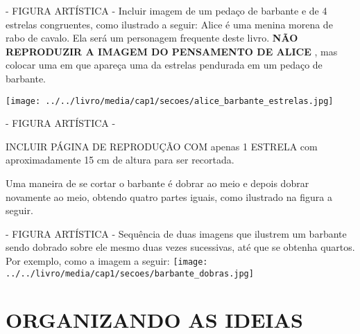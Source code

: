 \documentclass[a4paper,12pt,twoside]{book}
\begin{document}
\begin{imagem*}[breakable]{}{}    - FIGURA ARTÍSTICA - Incluir imagem de um pedaço de barbante e de 4 estrelas congruentes, como ilustrado a seguir:  
  Alice é uma menina morena de rabo de cavalo. Ela será um personagem frequente deste livro.  
  {\bf NÃO REPRODUZIR A IMAGEM DO PENSAMENTO DE ALICE}  , mas colocar uma em que apareça uma da estrelas pendurada em um pedaço de barbante.   
  
    \texttt{[image: ../../livro/media/cap1/secoes/alice\_barbante\_estrelas.jpg]}  
\end{imagem*}

\begin{imagem*}[breakable]{}{}   - FIGURA ARTÍSTICA -  
  \begin{nota*}[breakable]{}{}         
    INCLUIR PÁGINA DE REPRODUÇÃO COM apenas 1 ESTRELA com aproximadamente 15 cm de altura para ser recortada.    
  \end{nota*}  
\end{imagem*}


\begin{resposta*}[breakable]{}{}   Uma maneira de se cortar o barbante é dobrar ao meio e depois dobrar novamente ao meio, obtendo quatro partes iguais, como ilustrado na figura a seguir.  
  \begin{imagem*}[breakable]{}{}     - FIGURA ARTÍSTICA - Sequência de duas imagens que ilustrem um barbante sendo dobrado sobre ele mesmo duas vezes sucessivas, até que se obtenha quartos. Por exemplo, como a imagem a seguir:    
        \texttt{[image: ../../livro/media/cap1/secoes/barbante\_dobras.jpg]}    
  \end{imagem*}  
\end{resposta*}





\section*{ORGANIZANDO AS IDEIAS }
\end{document}

